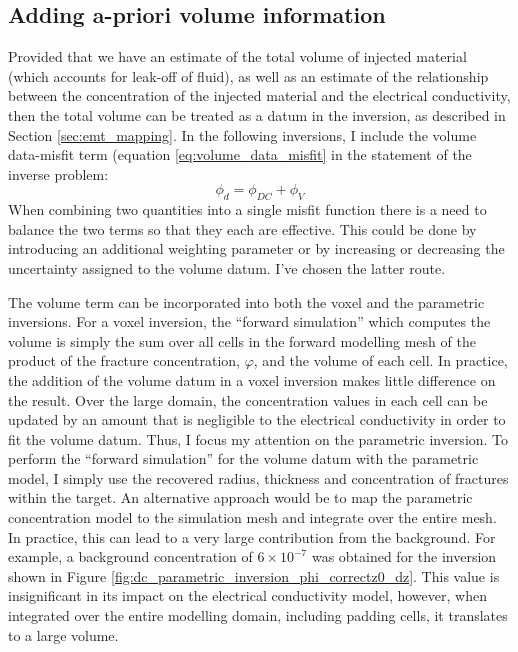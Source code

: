 \subsection{Adding a-priori volume information}
Provided that we have an estimate of the total volume of injected material (which accounts for leak-off of fluid), as well as an estimate of the relationship between the concentration of the injected material and the electrical conductivity, then the total volume can be treated as a datum in the inversion, as described in Section \ref{sec:emt_mapping}. In the following inversions, I include the volume data-misfit term (equation \ref{eq:volume_data_misfit} in the statement of the inverse problem:
\begin{equation}
    \phi_d = \phi_{DC} + \phi_V
   \label{eq:data-misfit-with-volume}
\end{equation}
When combining two quantities into a single misfit function there is a need to balance the two terms so that they each are effective. This could be done by introducing an additional weighting parameter or by increasing or decreasing the uncertainty assigned to the volume datum. I've chosen the latter route.

The volume term can be incorporated into both the voxel and the parametric inversions. For a voxel inversion, the ``forward simulation'' which computes the volume is simply the sum over all cells in the forward modelling mesh of the product of the fracture concentration, $\varphi$, and the volume of each cell. In practice, the addition of the volume datum in a voxel inversion makes little difference on the result. Over the large domain, the concentration values in each cell can be updated by an amount that is negligible to the electrical conductivity in order to fit the volume datum. Thus, I focus my attention on the parametric inversion. To perform the ``forward simulation'' for the volume datum with the parametric model, I simply use the recovered radius, thickness and concentration of fractures within the target. An alternative approach would be to map the parametric concentration model to the simulation mesh and integrate over the entire mesh. In practice, this can lead to a very large contribution from the background. For example, a background concentration of $6 \times 10^{-7}$ was obtained for the inversion shown in Figure \ref{fig:dc_parametric_inversion_phi_correctz0_dz}. This value is insignificant in its impact on the electrical conductivity model, however, when integrated over the entire modelling domain, including padding cells, it translates to a large volume.

